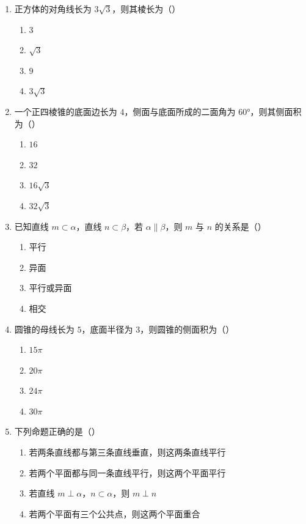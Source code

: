 \documentclass[12pt, a4paper]{ctexart}
\begin{document}
\begin{enumerate}
\item 正方体的对角线长为 $3\sqrt{3}$，则其棱长为（\quad）
  \begin{enumerate}[label=\Alph*., itemsep=0pt]
    \item $3$ \quad \item $\sqrt{3}$ \quad \item $9$ \quad \item $3\sqrt{3}$
  \end{enumerate}

\item 一个正四棱锥的底面边长为 $4$，侧面与底面所成的二面角为 $60°$，则其侧面积为（\quad）
  \begin{enumerate}[label=\Alph*., itemsep=0pt]
    \item $16$ \quad \item $32$ \quad \item $16\sqrt{3}$ \quad \item $32\sqrt{3}$
  \end{enumerate}

\item 已知直线 $m\subset\alpha$，直线 $n\subset\beta$，若 $\alpha\parallel\beta$，则 $m$ 与 $n$ 的关系是（\quad）
  \begin{enumerate}[label=\Alph*., itemsep=0pt]
    \item 平行 \quad \item 异面 \quad \item 平行或异面 \quad \item 相交
  \end{enumerate}

\item 圆锥的母线长为 $5$，底面半径为 $3$，则圆锥的侧面积为（\quad）
  \begin{enumerate}[label=\Alph*., itemsep=0pt]
    \item $15\pi$ \quad \item $20\pi$ \quad \item $24\pi$ \quad \item $30\pi$
  \end{enumerate}

\item 下列命题正确的是（\quad）
  \begin{enumerate}[label=\Alph*., itemsep=0pt]
    \item 若两条直线都与第三条直线垂直，则这两条直线平行
    \item 若两个平面都与同一条直线平行，则这两个平面平行
    \item 若直线 $m\perp\alpha$，$n\subset\alpha$，则 $m\perp n$
    \item 若两个平面有三个公共点，则这两个平面重合
  \end{enumerate}


\end{enumerate}
\end{document}
